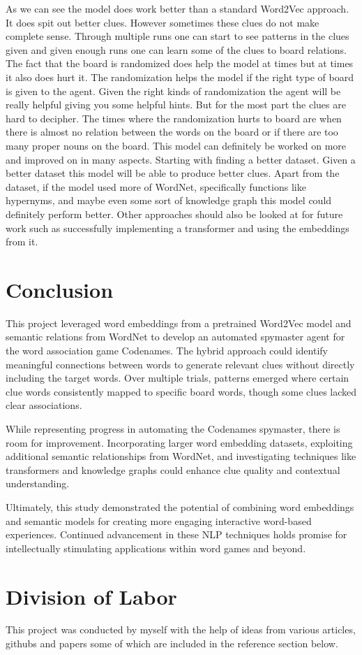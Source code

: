 \documentclass[11pt,a4paper]{article}
\begin{document}
As we can see the model does work better than a standard Word2Vec approach. It does spit out better clues. However sometimes these clues do not make complete sense. Through multiple runs one can start to see patterns in the clues given and given enough runs one can learn some of the clues to board relations. The fact that the board is randomized does help the model at times but at times it also does hurt it. The randomization helps the model if the right type of board is given to the agent. Given the right kinds of randomization the agent will be really helpful giving you some helpful hints. But for the most part the clues are hard to decipher. The times where the randomization hurts to board are when there is almost no relation between the words on the board or if there are too many proper nouns on the board. 
This model can definitely be worked on more and improved on in many aspects. Starting with finding a better dataset. Given a better dataset this model will be able to produce better clues. Apart from the dataset, if the model used more of WordNet, specifically functions like hypernyms, and maybe even some sort of knowledge graph this model could definitely perform better. Other approaches should also be looked at for future work such as successfully implementing a transformer and using the embeddings from it.



\section{Conclusion}
This project leveraged word embeddings from a pretrained Word2Vec model and semantic relations from WordNet to develop an automated spymaster agent for the word association game Codenames. The hybrid approach could identify meaningful connections between words to generate relevant clues without directly including the target words. Over multiple trials, patterns emerged where certain clue words consistently mapped to specific board words, though some clues lacked clear associations.  

While representing progress in automating the Codenames spymaster, there is room for improvement. Incorporating larger word embedding datasets, exploiting additional semantic relationships from WordNet, and investigating techniques like transformers and knowledge graphs could enhance clue quality and contextual understanding.

Ultimately, this study demonstrated the potential of combining word embeddings and semantic models for creating more engaging interactive word-based experiences. Continued advancement in these NLP techniques holds promise for intellectually stimulating applications within word games and beyond.

\section{Division of Labor}
This project was conducted by myself with the help of ideas from various articles, githubs and papers some of which are included in the reference section below. 







\end{document}
